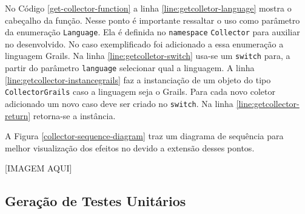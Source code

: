 No Código \ref{get-collector-function} a linha \ref{line:getcolletor-language}
mostra o cabeçalho da função. Nesse ponto é importante ressaltar o uso como
parâmetro da enumeração \lstinline|Language|. Ela é definida no \lstinline|namespace|
\lstinline|Collector| para auxiliar no desenvolvido. No caso exemplificado foi
adicionado a essa enumeração a linguagem \textsf{Grails}. Na linha
\ref{line:getcolletor-switch} usa-se um \lstinline|switch| para, a partir do parâmetro
\lstinline|language| selecionar qual a linguagem. A linha
\ref{line:getcollector-instancegrails} faz a instanciação de um objeto do tipo
\lstinline|CollectorGrails| caso a linguagem seja o \textsf{Grails}. Para cada novo
coletor adicionado um novo caso deve ser criado no \lstinline|switch|. Na linha
\ref{line:getcollector-return} retorna-se a instância.

A Figura \ref{collector-sequence-diagram} traz um diagrama de sequência para melhor
visualização dos efeitos no \scarefault devido a extensão desses pontos.

[IMAGEM AQUI]


\subsection{Geração de Testes Unitários}


